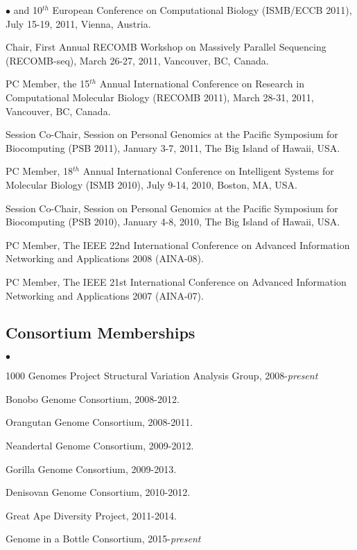 \documentclass[margin,line]{res}
\newenvironment{list2}{
  \begin{list}{$\bullet$}{%
      \setlength{\itemsep}{0in}
      \setlength{\parsep}{0in} \setlength{\parskip}{0in}
      \setlength{\topsep}{0in} \setlength{\partopsep}{0in} 
      \setlength{\leftmargin}{0.2in}}}{\end{list}}
\begin{document}
\begin{resume}
\begin{list2}
  and 10$^{th}$ European Conference on Computational Biology 
  (ISMB/ECCB 2011), July 15-19, 2011, Vienna, Austria.
\item
  Chair, First Annual RECOMB Workshop on Massively Parallel Sequencing (RECOMB-seq), March 26-27, 2011, Vancouver, BC, Canada.
\item
  PC Member, the 15$^{th}$ Annual International Conference on Research in Computational Molecular Biology
  (RECOMB 2011), March 28-31, 2011, Vancouver, BC, Canada.
\item 
  Session Co-Chair, Session on Personal Genomics at the Pacific Symposium for Biocomputing (PSB 2011),
  January 3-7, 2011, The Big Island of Hawaii, USA.
\item
  PC Member, 18$^{th}$ Annual International Conference on Intelligent Systems for Molecular Biology
  (ISMB 2010), July 9-14, 2010, Boston, MA, USA.
\item 
  Session Co-Chair, Session on Personal Genomics at the Pacific Symposium for Biocomputing (PSB 2010),
  January 4-8, 2010, The Big Island of Hawaii, USA.
\item
  PC Member, The IEEE 22nd International Conference on
  Advanced Information Networking and Applications 2008 (AINA-08).
\item
  PC Member, The IEEE 21st International Conference on
  Advanced Information Networking and Applications 2007 (AINA-07).
\end{list2}


\vspace{-0.5cm}
\subsection{\small \sc Consortium Memberships}

\begin{list2}
\item
  1000 Genomes Project Structural Variation Analysis Group, 2008-{\it present}
\item
  Bonobo Genome Consortium, 2008-2012.
\item
  Orangutan Genome Consortium, 2008-2011.
\item
  Neandertal Genome Consortium, 2009-2012.
\item
  Gorilla Genome Consortium, 2009-2013.
\item
  Denisovan Genome Consortium, 2010-2012.
\item
  Great Ape Diversity Project, 2011-2014.
\item
  Genome in a Bottle Consortium, 2015-{\it present}
\end{list2}



\end{resume}
\end{document}
